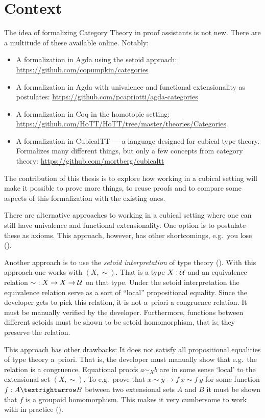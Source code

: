 \section{Context}
\label{sec:context}
%
The idea of formalizing Category Theory in proof assistants is not new.  There
are a multitude of these available online.  Notably:
%
\begin{itemize}
\item
  A formalization in Agda using the setoid approach:
  \url{https://github.com/copumpkin/categories}
\item
  A formalization in Agda with univalence and functional
  extensionality as postulates:
  \url{https://github.com/pcapriotti/agda-categories}
\item
  A formalization in Coq in the homotopic setting:
  \url{https://github.com/HoTT/HoTT/tree/master/theories/Categories}
\item
  A formalization in CubicalTT --- a language designed for
  cubical type theory.  Formalizes many different things, but only a
  few concepts from category theory:
  \url{https://github.com/mortberg/cubicaltt}
\end{itemize}
%
The contribution of this thesis is to explore how working in a cubical
setting will make it possible to prove more things, to reuse proofs
and to compare some aspects of this formalization with the existing
ones.

There are alternative approaches to working in a cubical setting where
one can still have univalence and functional extensionality.  One
option is to postulate these as axioms.  This approach, however, has
other shortcomings, e.g.\ you lose 
(\cite[p.\ 3]{huber-2016}).

Another approach is to use the \emph{setoid interpretation} of type
theory (\cite{hofmann-1995,huber-2016}). With this approach one works
with  $(X, \sim)$. That is a type $X \mathrel{:}
\mathcal{U}$ and an equivalence relation $\sim\ \mathrel{:} X \to X \to \mathcal{U}$ on that
type. Under the setoid interpretation the equivalence relation serve
as a sort of ``local'' propositional equality. Since the developer
gets to pick this relation, it is not a~priori a congruence
relation. It must be manually verified by the developer.  Furthermore,
functions between different setoids must be shown to be setoid
homomorphism, that is; they preserve the relation.

This approach has other drawbacks: It does not satisfy all
propositional equalities of type theory a~priori. That is, the
developer must manually show that e.g.\ the relation is a congruence.
Equational proofs $a \sim_{X} b$ are in some sense `local' to the
extensional set $(X , \sim)$. To e.g.\ prove that $x ∼ y → f\ x ∼
f\ y$ for some function $f \tp A → B$ between two extensional sets $A$
and $B$ it must be shown that $f$ is a groupoid homomorphism. This
makes it very cumbersome to work with in practice (\cite[p.
  4]{huber-2016}).

